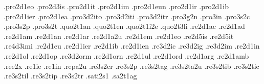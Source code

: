 {.pro2d1eo .pro2d3is .pro2d1it .pro2d1im .pro2d1eun .pro2d1ir 
.pro2d1ib .pro2d1ier .pro2d1ea    %
.pro3d2ito  .pro3d2iti .pro3d2itr %
.pro3g2n                          %
.pro3in                           %
.pro3s2c                          %
.pro3s2p                          %
.pro3s2t                          %
.quo2t1an                         %
.quo2t1en                         %
.quo2t1i2e             %
.quo2t3li                         %
.re2d1ac                          %
.re2d1ad                          %
.re2d1am                          %
.re2d1an                          %
.re2d1ar                          %
.re2d1a2u                         %
.re2d1em                          %
.re2d1eo .re2d5is .re2d5it  
.re4d3imi .re2d1eu .re2d1ier 
.re2d1ib .re2d1ien                %
.re3d2ic                          %
.re3d2ig                          %
.re3d2im                          %
.re2d1in                          %
.re2d1ol                          %
.re2d1op                          %
.re3d2orm                         %
.re2d1orn                         %
.re2d1ul                          %
.re2d1ord                         %
.re2d1arg                         %
.re2d1amb                         %
.ree2x                            %
.re1ie                            %
.re1in                            %
.repa2u                           %
.re3s2cr                          %
.re3s2p                           %
.re3s2tag                         %
.re3s2ta2u                        %
.re3s2tib                         %
.re3s2tic                         %
.re3s2til                         %
.re3s2tip                         %
.re3s2tr                          %
.sati2s1                          %
.sa2t1ag                          %
}
